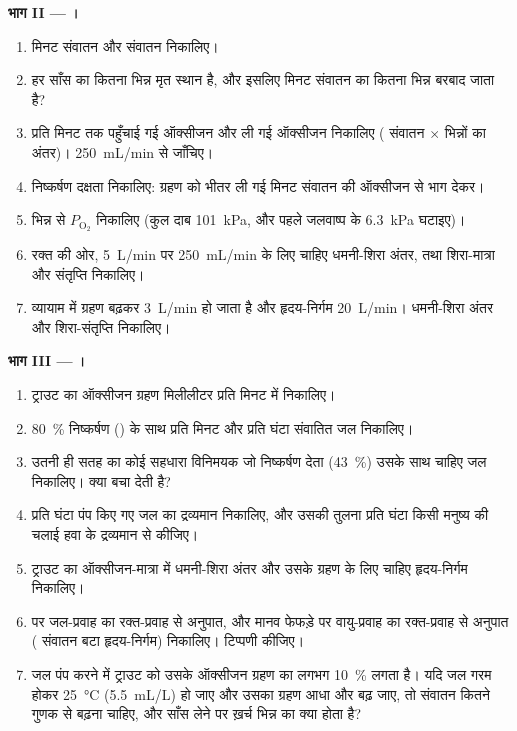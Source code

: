 \begin{problem}
\medskip
\noindent\textbf{भाग II --- ।}
\begin{enumerate}[resume]
  \item मिनट संवातन और  संवातन निकालिए।
  \item हर साँस का कितना भिन्न मृत स्थान है, और इसलिए मिनट संवातन का
        कितना भिन्न बरबाद जाता है?
  \item प्रति मिनट  तक पहुँचाई गई ऑक्सीजन और ली गई ऑक्सीजन
        निकालिए ( संवातन $\times$ भिन्नों का
        अंतर)। \qty{250}{mL/min} से जाँचिए।
  \item निष्कर्षण दक्षता निकालिए: ग्रहण को भीतर ली गई मिनट संवातन की
        ऑक्सीजन से भाग देकर।
  \item {} भिन्न से  $P_{\mathrm{O_2}}$ निकालिए (कुल दाब
        \qty{101}{kPa}, और पहले जलवाष्प के \qty{6.3}{kPa} घटाइए)।
  \item रक्त की ओर, \qty{5}{L/min} पर \qty{250}{mL/min} के लिए चाहिए
        धमनी-शिरा अंतर, तथा शिरा-मात्रा और संतृप्ति निकालिए।
  \item व्यायाम में ग्रहण बढ़कर \qty{3}{L/min} हो जाता है और
        हृदय-निर्गम \qty{20}{L/min}। धमनी-शिरा अंतर और शिरा-संतृप्ति
        निकालिए।
\end{enumerate}

\medskip
\noindent\textbf{भाग III --- ।}
\begin{enumerate}[resume]
  \item ट्राउट का ऑक्सीजन ग्रहण मिलीलीटर प्रति मिनट में निकालिए।
  \item \qty{80}{\%} निष्कर्षण () के साथ प्रति मिनट और प्रति
        घंटा संवातित जल निकालिए।
  \item उतनी ही सतह का कोई सहधारा विनिमयक जो निष्कर्षण देता
        (\qty{43}{\%}) उसके साथ चाहिए जल निकालिए।  क्या बचा
        देती है?
  \item प्रति घंटा पंप किए गए जल का द्रव्यमान निकालिए, और उसकी तुलना
        प्रति घंटा किसी मनुष्य की चलाई हवा के द्रव्यमान से कीजिए।
  \item ट्राउट का ऑक्सीजन-मात्रा में धमनी-शिरा अंतर और उसके ग्रहण के
        लिए चाहिए हृदय-निर्गम निकालिए।
  \item {} पर जल-प्रवाह का रक्त-प्रवाह से अनुपात, और मानव फेफड़े पर
        वायु-प्रवाह का रक्त-प्रवाह से अनुपात ( संवातन बटा
        हृदय-निर्गम) निकालिए। टिप्पणी कीजिए।
  \item जल पंप करने में ट्राउट को उसके ऑक्सीजन ग्रहण का लगभग
        \qty{10}{\%} लगता है। यदि जल गरम होकर \qty{25}{\celsius}
        (\qty{5.5}{mL/L}) हो जाए और उसका ग्रहण आधा और बढ़ जाए, तो
        संवातन कितने गुणक से बढ़ना चाहिए, और साँस लेने पर ख़र्च भिन्न का
        क्या होता है?
\end{enumerate}


\end{problem}
